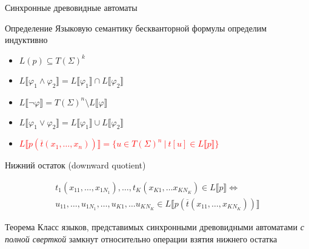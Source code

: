\documentclass{beamer}
\renewcommand{\phi}{\ensuremath{\varphi}}
\begin{document}
\begin{frame}{Синхронные древовидные автоматы}
\begin{block}{Определение}
\small Языковую семантику бескванторной формулы определим индуктивно
\begin{itemize}
        \item $L(p) \subseteq T(\Sigma)^k$
        \item $L\llbracket \phi_1 \wedge \phi_2 \rrbracket = L \llbracket \phi_1 \rrbracket \cap L \llbracket \phi_2 \rrbracket$
        \item $L\llbracket \neg \phi \rrbracket = T(\Sigma)^n \setminus L \llbracket \phi \rrbracket$
        \item $L\llbracket \phi_1 \vee \phi_2 \rrbracket = L \llbracket \phi_1 \rrbracket \cup L \llbracket \phi_2 \rrbracket$ 
        \item \textcolor<2-3>{red}{$L\llbracket p(\overline{t}(x_1, \ldots, x_n)) \rrbracket = \{ u \in T(\Sigma)^n \ | \ t[u] \in L\llbracket p \rrbracket \}$} 
\end{itemize}
\end{block}
\pause

\begin{block}{Нижний остаток (downward quotient)}
\vspace{-1em}
\begin{center}
    \begin{align*}
    t_1(x_{11}, \ldots, x_{1N_1}), \ldots, t_K(x_{K1}, \ldots x_{KN_K}) \in L\llbracket p \rrbracket  \iff \\
    u_{11}, \ldots, u_{1N_1}, \ldots, u_{K1}, \ldots u_{KN_K} \in L\llbracket p(\overline{t}(x_{11}, \ldots, x_{KN_K})) \rrbracket
    \end{align*}
\end{center}

\end{block}

\pause
\vspace{-6.5em}
\begin{block}{Теорема}
Класс языков, представимых синхронными древовидными автоматами \textit{с полной сверткой} замкнут относительно операции взятия нижнего остатка
\end{block}
\end{frame}
\end{document}
